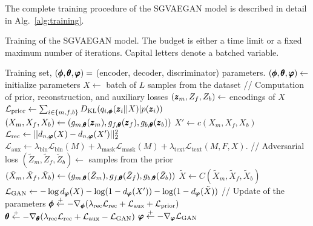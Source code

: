 The complete training procedure of the SGVAEGAN model is described in detail in Alg.~\ref{alg:training}.
\begin{algorithm}
\caption{Training of the SGVAEGAN model. The budget is either a time limit or a fixed maximum number of iterations. Capital letters denote a batched variable.}\label{alg:training}
\begin{algorithmic}[1]
\Require Training set, $(\pmb{{\phi}}, \pmb{{\theta}}, \pmb{{\varphi}}) = $ (encoder, decoder, discriminator) parameters.
\State $(\pmb{{\phi}}, \pmb{{\theta}}, \pmb{{\varphi}})  \leftarrow $ initialize parameters
\State $X \leftarrow $ batch of $L$ samples from the dataset
\State // Computation of prior, reconstruction, and auxiliary losses
\State $(\pmb{{z}}_m, Z_f, Z_b) \leftarrow $ encodings of $X$
\State $\mathcal{L}_{\text{prior}} \leftarrow \sum_{i \in \lbrace m, f, b \rbrace} D_\text{KL} (q_{i,\pmb{{\phi}}} (\pmb{{z}}_i \vert \vert X) \vert p(\pmb{{z}}_i))$  
\State $(X_m,X_f,X_b) \leftarrow (g_{m, \pmb{{\theta}}}(\pmb{{z}}_m), g_{f, \pmb{{\theta}}}(\pmb{{z}}_f), g_{b, \pmb{{\theta}}}(\pmb{{z}}_b))$ 
\State $X' \leftarrow c(X_m,X_f,X_b)$
\State $\mathcal{L}_{\text{rec}} \leftarrow \vert \vert d_{n,\pmb{{\varphi}}}(X) - d_{n,\pmb{{\varphi}}}(X') \vert \vert_2^2$
\State $\mathcal{L}_{\text{aux}} \leftarrow \lambda_{\text{bin}}\mathcal{L}_{\text{bin}}(M) + \lambda_{\text{mask}}\mathcal{L}_{\text{mask}}(M) + \lambda_{\text{text}}\mathcal{L}_{\text{text}}(M,F,X).$
\State // Adversarial loss 
\State $(\tilde{Z}_m, \tilde{Z}_f, \tilde{Z}_b) \leftarrow $ samples from the prior
\State $(\tilde{X}_m,\tilde{X}_f,\tilde{X}_b) \leftarrow (g_{m, \pmb{{\theta}}}(\tilde{Z}_m), g_{f, \pmb{{\theta}}}(\tilde{Z}_f), g_{b, \pmb{{\theta}}}(\tilde{Z}_b))$ 
\State $\tilde{X} \leftarrow C(\tilde{X}_m,\tilde{X}_f,\tilde{X}_b)$
\State $\mathcal{L}_{\text{GAN}} \leftarrow - \log d_{\pmb{{\varphi}}}(X) - \log (1 - d_{\pmb{{\varphi}}}(X')) - \log (1-d_{\pmb{{\varphi}}}(\tilde{X}))$
\State // Update of the parameters
\State $\pmb{{\phi}} \stackrel{+}\leftarrow -\nabla_{\pmb{{\phi}}} (\lambda_{\text{rec}} \mathcal{L}_{\text{rec}} + \mathcal{L}_{\text{aux}} + \mathcal{L}_{\text{prior}})$
\State $\pmb{{\theta}} \stackrel{+}\leftarrow -\nabla_{\pmb{{\theta}}} (\lambda_{\text{rec}} \mathcal{L}_{\text{rec}} + \mathcal{L}_{\text{aux}} - \mathcal{L}_{\text{GAN}})$
\State $\pmb{{\varphi}} \stackrel{+}\leftarrow -\nabla_{\pmb{{\varphi}}} \mathcal{L}_{\text{GAN}}$
\EndWhile
\end{algorithmic}
\end{algorithm}

